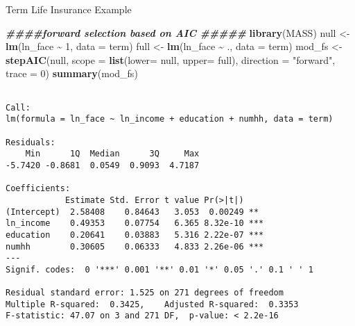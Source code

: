 \documentclass[
  ignorenonframetext,
]{beamer}
\newenvironment{Shaded}{\begin{snugshade}}{\end{snugshade}}
\newcommand{\AttributeTok}[1]{\textcolor[rgb]{0.13,0.29,0.53}{#1}}
\newcommand{\DecValTok}[1]{\textcolor[rgb]{0.00,0.00,0.81}{#1}}
\newcommand{\DocumentationTok}[1]{\textcolor[rgb]{0.56,0.35,0.01}{\textbf{\textit{#1}}}}
\newcommand{\FunctionTok}[1]{\textcolor[rgb]{0.13,0.29,0.53}{\textbf{#1}}}
\newcommand{\NormalTok}[1]{#1}
\newcommand{\OtherTok}[1]{\textcolor[rgb]{0.56,0.35,0.01}{#1}}
\newcommand{\SpecialCharTok}[1]{\textcolor[rgb]{0.81,0.36,0.00}{\textbf{#1}}}
\newcommand{\StringTok}[1]{\textcolor[rgb]{0.31,0.60,0.02}{#1}}
\begin{document}
\begin{frame}[fragile]{Term Life Insurance Example}
\protect\hypertarget{term-life-insurance-example-5}{}
\tiny

\begin{Shaded}
\begin{Highlighting}[]
\DocumentationTok{\#\#\#\#forward selection based on AIC \#\#\#\#\#}
\FunctionTok{library}\NormalTok{(MASS)}
\NormalTok{null }\OtherTok{\textless{}{-}} \FunctionTok{lm}\NormalTok{(ln\_face  }\SpecialCharTok{\textasciitilde{}} \DecValTok{1}\NormalTok{, }\AttributeTok{data =}\NormalTok{ term)}
\NormalTok{full }\OtherTok{\textless{}{-}} \FunctionTok{lm}\NormalTok{(ln\_face }\SpecialCharTok{\textasciitilde{}}\NormalTok{ ., }\AttributeTok{data =}\NormalTok{ term)}
\NormalTok{mod\_fs }\OtherTok{\textless{}{-}} \FunctionTok{stepAIC}\NormalTok{(null, }\AttributeTok{scope =} \FunctionTok{list}\NormalTok{(}\AttributeTok{lower=}\NormalTok{ null, }\AttributeTok{upper=}\NormalTok{ full), }
                  \AttributeTok{direction =} \StringTok{"forward"}\NormalTok{, }\AttributeTok{trace =} \DecValTok{0}\NormalTok{)}
\FunctionTok{summary}\NormalTok{(mod\_fs)}
\end{Highlighting}
\end{Shaded}

\begin{verbatim}

Call:
lm(formula = ln_face ~ ln_income + education + numhh, data = term)

Residuals:
    Min      1Q  Median      3Q     Max 
-5.7420 -0.8681  0.0549  0.9093  4.7187 

Coefficients:
            Estimate Std. Error t value Pr(>|t|)    
(Intercept)  2.58408    0.84643   3.053  0.00249 ** 
ln_income    0.49353    0.07754   6.365 8.32e-10 ***
education    0.20641    0.03883   5.316 2.22e-07 ***
numhh        0.30605    0.06333   4.833 2.26e-06 ***
---
Signif. codes:  0 '***' 0.001 '**' 0.01 '*' 0.05 '.' 0.1 ' ' 1

Residual standard error: 1.525 on 271 degrees of freedom
Multiple R-squared:  0.3425,    Adjusted R-squared:  0.3353 
F-statistic: 47.07 on 3 and 271 DF,  p-value: < 2.2e-16
\end{verbatim}

\normalsize
\end{frame}
\end{document}
